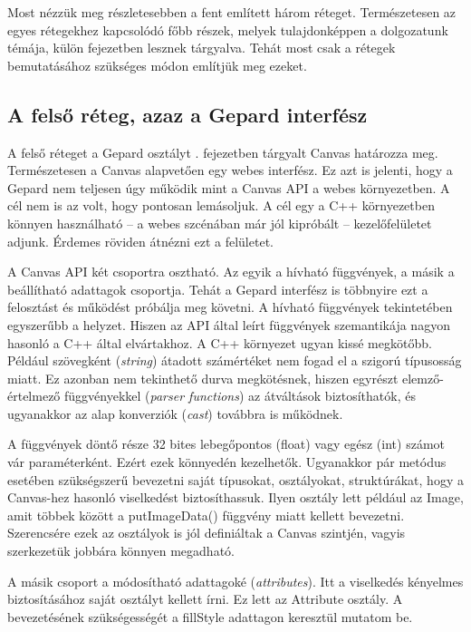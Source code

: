 \documentclass[12pt]{report}
\theoremstyle{definition}
\newcommand{\inenglish}[1]{\textsl{#1}}
\newcommand{\func}[1]{{\textsf{\footnotesize{#1}}}}
\begin{document}
Most nézzük meg részletesebben a fent említett három réteget. Természetesen az
egyes rétegekhez kapcsolódó főbb részek, melyek tulajdonképpen a dolgozatunk
témája, külön fejezetben lesznek tárgyalva. Tehát most csak a rétegek
bemutatásához szükséges módon említjük meg ezeket.

    \subsection*{A felső réteg, azaz a Gepard interfész}

A felső réteget a \func{Gepard} osztályt . fejezetben tárgyalt
Canvas határozza meg. Természetesen  a Canvas alapvetően egy webes interfész.
Ez azt is jelenti, hogy a \func{Gepard} nem teljesen úgy működik mint a Canvas
API a webes környezetben. A cél nem is az volt, hogy pontosan lemásoljuk. A cél
egy a C++ környezetben könnyen használható -- a webes szcénában már jól
kipróbált -- kezelőfelületet adjunk. Érdemes röviden átnézni ezt a felületet.

A Canvas API két csoportra osztható. Az egyik a hívható függvények, a másik a
beállítható adattagok csoportja. Tehát a Gepard interfész is többnyire ezt a
felosztást és működést próbálja meg követni. A hívható függvények tekintetében
egyszerűbb a helyzet. Hiszen az API által leírt függvények szemantikája nagyon
hasonló a C++ által elvártakhoz. A C++ környezet ugyan kissé megkötőbb. Például
szövegként (\inenglish{string}) átadott számértéket nem fogad el a szigorú
típusosság miatt. Ez azonban nem tekinthető durva megkötésnek, hiszen egyrészt
elemző-értelmező függvényekkel (\inenglish{parser functions}) az átváltások
biztosíthatók, és ugyanakkor az alap konverziók (\inenglish{cast}) továbbra is
működnek.

A függvények döntő része 32 bites lebegőpontos (\func{float}) vagy egész
(\func{int}) számot vár paraméterként. Ezért ezek könnyedén kezelhetők.
Ugyanakkor pár metódus esetében szükségszerű bevezetni saját típusokat,
osztályokat, struktúrákat, hogy a Canvas-hez hasonló viselkedést
biztosíthassuk. Ilyen osztály lett például az \func{Image}, amit többek között
a \func{putImageData()} függvény miatt kellett bevezetni. Szerencsére ezek az
osztályok is jól definiáltak a Canvas szintjén, vagyis szerkezetük jobbára
könnyen megadható.

A másik csoport a módosítható adattagoké (\inenglish{attributes}). Itt a
viselkedés kényelmes biztosításához saját osztályt kellett írni. Ez lett az
\func{Attribute} osztály. A bevezetésének szükségességét a \func{fillStyle}
adattagon keresztül mutatom be.
\end{document}
